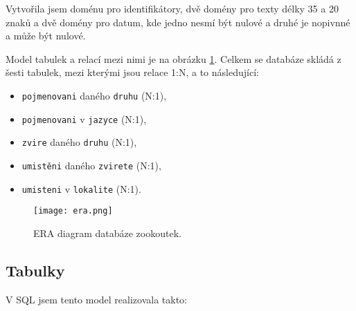 \documentclass{article}
\begin{document}
Vytvořila jsem doménu pro identifikátory, dvě domény pro texty délky 35 a 20 znaků a dvě domény pro datum, kde jedno nesmí být nulové a druhé je nopivnné a může být nulové.

Model tabulek a relací mezi nimi je na obrázku \ref{fig:era}. Celkem se databáze skládá z šesti tabulek, mezi kterými jsou relace 1:N, a to následující:
\begin{itemize}
    \item \texttt{pojmenovani} daného \texttt{druhu} (N:1),
    \item \texttt{pojmenovani} v \texttt{jazyce} (N:1),
    \item \texttt{zvire} daného \texttt{druhu} (N:1),
    \item \texttt{umistěni} daného \texttt{zvirete} (N:1),
    \item \texttt{umisteni} v \texttt{lokalite} (N:1).
\end{itemize}

\begin{figure}[h]
    \centering
    \texttt{[image: era.png]}
    \caption{ERA diagram databáze zookoutek.}
  
    \label{fig:era}
\end{figure}

\newpage


\subsection{Tabulky}

V SQL jsem tento model realizovala takto:
\end{document}
